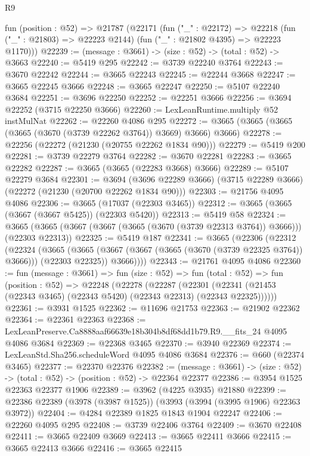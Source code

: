 \begin{lexlean}{R9}
\begin{coremodule}
  fun (position : @52) =>
  @21787
    (@22171
      (fun ("_" : @22172) =>
      @22218 (fun ("_" : @21803) => @22223 @2144) (fun ("_" : @21802 @4395) => @22223 @1170)))
@22239 := (message : @3661) -> (size : @52) -> (total : @52) -> @3663
@22240 := @5419 @295
@22242 := @3739 @22240 @3764
@22243 := @3670 @22242
@22244 := @3665 @22243
@22245 := @22244 @3668
@22247 := @3665 @22245 @3666
@22248 := @3665 @22247
@22250 := @5107 @22240 @3684
@22251 := @3696 @22250
@22252 := @22251 @3666
@22256 := @3694 @22252 (@3715 @22250 @3666)
@22260 := LexLeanRuntime.multiply @52 instMulNat
@22262 := @22260 @4086 @295
@22272 := @3665 (@3665 (@3665 (@3665 (@3670 (@3739 @22262 @3764)) @3669) @3666) @3666)
@22278 := @22256 (@22272 (@21230 (@20755 @22262 @1834 @90)))
@22279 := @5419 @200
@22281 := @3739 @22279 @3764
@22282 := @3670 @22281
@22283 := @3665 @22282
@22287 := @3665 (@3665 (@22283 @3668) @3666)
@22289 := @5107 @22279 @3684
@22301 := @3694
    (@3696 @22289 @3666)
    (@3715 @22289 @3666)
    (@22272 (@21230 (@20700 @22262 @1834 @90)))
@22303 := @21756 @4095 @4086
@22306 := @3665 (@17037 (@22303 @3465))
@22312 := @3665 (@3665 (@3667 (@3667 @5425)) (@22303 @5420))
@22313 := @5419 @58
@22324 := @3665 (@3665 (@3667 (@3667 (@3665 (@3670 (@3739 @22313 @3764)) @3666))) (@22303 @22313))
@22325 := @5419 @187
@22341 := @3665
    (@22306
      (@22312
        (@22324
          (@3665
            (@3665 (@3667 (@3667 (@3665 (@3670 (@3739 @22325 @3764)) @3666))) (@22303 @22325))
            @3666))))
@22343 := @21761 @4095 @4086
@22360 := fun (message : @3661) =>
  fun (size : @52) =>
  fun (total : @52) =>
  fun (position : @52) =>
  @22248
    (@22278
      (@22287
        (@22301 (@22341 (@21453 (@22343 @3465) (@22343 @5420) (@22343 @22313) (@22343 @22325))))))
@22361 := @3931 @1525
@22362 := @11696 @21753
@22363 := @21902 @22362
@22364 := @22361 @22363
@22368 := LexLeanPreserve.Ca8888aaf66639e18b304b8df68dd1b79.R9.__fits_24 @4095 @4086 @3684
@22369 := @22368 @3465
@22370 := @3940 @22369
@22374 := LexLeanStd.Sha256.scheduleWord @4095 @4086 @3684
@22376 := @660 (@22374 @3465)
@22377 := @22370 @22376
@22382 := (message : @3661) -> (size : @52) -> (total : @52) -> (position : @52) -> @22364 @22377
@22386 := @3954 @1525 @22363 @22377 @1906
@22389 := @3962 (@4225 @3935) @21880
@22399 := @22386 @22389 (@3978 (@3987 @1525)) (@3993 (@3994 (@3995 @1906) @22363 @3972))
@22404 := @4284 @22389 @1825 @1843 @1904 @22247
@22406 := @22260 @4095 @295
@22408 := @3739 @22406 @3764
@22409 := @3670 @22408
@22411 := @3665 @22409 @3669
@22413 := @3665 @22411 @3666
@22415 := @3665 @22413 @3666
@22416 := @3665 @22415

\end{coremodule}
\end{lexlean}
